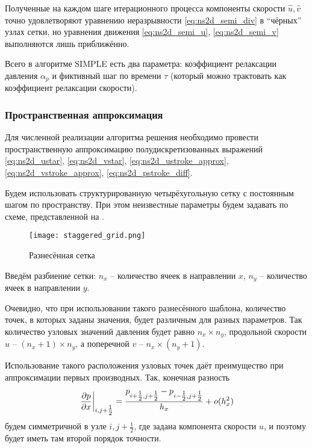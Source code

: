 Полученные на каждом шаге итерационного процесса компоненты скорости $\hat u, \hat v$
точно удовлетворяют уравнению неразрывности \eqref{eq:ns2d_semi_div} в ``чёрных'' узлах сетки, но
уравнения движения \eqref{eq:ns2d_semi_u}, \eqref{eq:ns2d_semi_v} выполняются лишь приближённо.

Всего в алгоритме SIMPLE есть два параметра: коэффициент
релаксации давления $\alpha_p$ и фиктивный шаг по времени $\tau$ (который можно трактовать как коэффициент релаксации скорости).

\subsubsection{Пространственная аппроксимация}

Для численной реализации алгоритма решения
необходимо провести пространственную аппроксимацию полудискретизованных
выражений
\eqref{eq:ns2d_ustar}, \eqref{eq:ns2d_vstar}, \eqref{eq:ns2d_ustroke_approx},
\eqref{eq:ns2d_vstroke_approx}, \eqref{eq:ns2d_pstroke_diff}.


Будем использовать структурированную четырёхугольную сетку
с постоянным шагом по пространству.
При этом неизвестные параметры будем задавать
по схеме, представленной на .

\begin{figure}[h]
\centering
\texttt{[image: staggered\_grid.png]}
\caption{Разнесённая сетка}
\label{fig:staggered_grid}
\end{figure}

Введём разбиение сетки:
$n_x$ -- количество ячеек в направлении $x$,
$n_y$ -- количество ячеек в направлении $y$.

Очевидно, что при использовании такого разнесённого шаблона,
количество точек, в которых заданы значения, будет
различным для разных параметров.
Так количество узловых значений давления будет равно $n_x \times n_y$,
продольной скорости $u$ -- $(n_x+1) \times n_y$, а поперечной $v$ -- $n_x \times (n_y+1)$.

Использование такого расположения узловых точек
даёт преимущество при аппроксимации
первых производных. Так, конечная разность
\begin{equation*}
\left.\frac{\partial p}{\partial x}\right|_{i, j+\tfrac12} = \frac{p_{i+\tfrac12,j+\tfrac12} - p_{i-\tfrac12,j+\tfrac12}}{h_x} + o(h_x^2)
\end{equation*}
будем симметричной в узле $i,j+\tfrac12$, где задана
компонента скорости $u$, и поэтому будет иметь там второй порядок точности.

